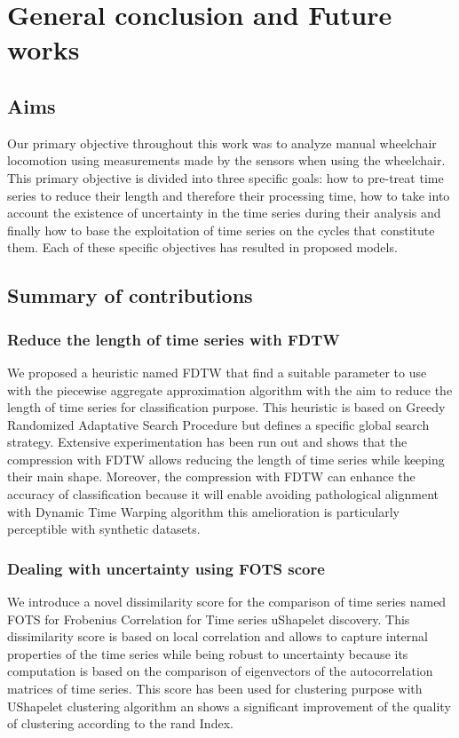 \chapter*{\textbf{General conclusion and Future works}}
\section*{Aims}
Our primary objective throughout this work was to analyze manual wheelchair locomotion using measurements made by the sensors when using the wheelchair.  This primary objective is divided into three specific goals: how to pre-treat time series to reduce their length and therefore their processing time, how to take into account the existence of uncertainty in the time series during their analysis and finally how to base the exploitation of time series on the cycles that constitute them. Each of these specific objectives has resulted in proposed models.
\section*{Summary of contributions}
\subsection*{Reduce the length of time series with FDTW}
We proposed a heuristic named FDTW that find a suitable parameter to use with the piecewise aggregate approximation algorithm with the aim to reduce the length of time series for classification purpose. This heuristic is based on Greedy Randomized  Adaptative Search Procedure but defines a specific global search strategy. Extensive experimentation has been run out and shows that the compression with FDTW allows reducing the length of time series while keeping their main shape. Moreover, the compression with FDTW can enhance the accuracy of classification because it will enable avoiding pathological alignment with Dynamic Time Warping algorithm this amelioration is particularly perceptible with synthetic datasets.
\subsection*{Dealing with uncertainty using FOTS score}
We introduce a novel dissimilarity score for the comparison of time series named FOTS for Frobenius Correlation for Time series uShapelet discovery. This dissimilarity score is based on local correlation and allows to capture internal properties of the time series while being robust to uncertainty because its computation is based on the comparison of eigenvectors of the autocorrelation matrices of time series. This score has been used for clustering purpose with UShapelet clustering algorithm an shows a significant improvement of the quality of clustering according to the rand Index.
